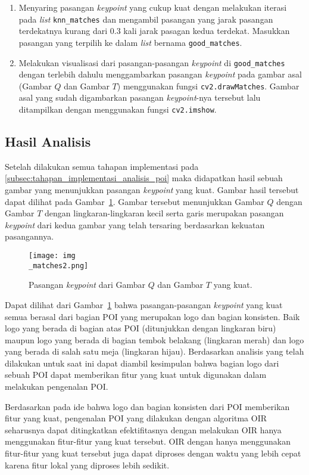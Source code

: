 \begin{enumerate}
	\item Menyaring pasangan \textit{keypoint} yang cukup kuat dengan melakukan iterasi pada \textit{list} \texttt{knn\_matches} dan mengambil pasangan yang jarak pasangan terdekatnya kurang dari $0.3$ kali jarak pasagan kedua terdekat. Masukkan pasangan yang terpilih ke dalam \textit{list} bernama \texttt{good\_matches}.
	\item Melakukan visualisasi dari pasangan-pasangan \textit{keypoint} di \texttt{good\_matches} dengan terlebih dahulu menggambarkan pasangan \textit{keypoint} pada gambar asal (Gambar $Q$ dan Gambar $T$) menggunakan fungsi \texttt{cv2.drawMatches}. Gambar asal yang sudah digambarkan pasangan \textit{keypoint}-nya tersebut lalu ditampilkan dengan menggunakan fungsi \texttt{cv2.imshow}.
\end{enumerate}

\subsection{Hasil Analisis}
Setelah dilakukan semua tahapan implementasi pada \ref{subsec:tahapan_implementasi_analisis_poi} maka didapatkan hasil sebuah gambar yang menunjukkan pasangan \textit{keypoint} yang kuat. Gambar hasil tersebut dapat dilihat pada Gambar~\ref{fig:keypoint_matches}. Gambar tersebut menunjukkan Gambar $Q$ dengan Gambar $T$ dengan lingkaran-lingkaran kecil serta garis merupakan pasangan \textit{keypoint} dari kedua gambar yang telah tersaring berdasarkan kekuatan pasangannya.
\begin{figure}[H]
	\centering
	\texttt{[image: img\\\_matches2.png]}
	\caption{Pasangan \textit{keypoint} dari Gambar $Q$ dan Gambar $T$ yang kuat.}
	\label{fig:keypoint_matches}
\end{figure}

Dapat dilihat dari Gambar~\ref{fig:keypoint_matches} bahwa pasangan-pasangan \textit{keypoint} yang kuat semua berasal dari bagian POI yang merupakan logo dan bagian konsisten. Baik logo yang berada di bagian atas POI (ditunjukkan dengan lingkaran biru) maupun logo yang berada di bagian tembok belakang (lingkaran merah) dan logo yang berada di salah satu meja (lingkaran hijau). Berdasarkan analisis yang telah dilakukan untuk saat ini dapat diambil kesimpulan bahwa bagian logo dari sebuah POI dapat memberikan fitur yang kuat untuk digunakan dalam melakukan pengenalan POI. 

Berdasarkan pada ide bahwa logo dan bagian konsisten dari POI memberikan fitur yang kuat, pengenalan POI yang dilakukan dengan algoritma OIR seharusnya dapat ditingkatkan efektifitasnya dengan melakukan OIR hanya menggunakan fitur-fitur yang kuat tersebut. OIR dengan hanya menggunakan fitur-fitur yang kuat tersebut juga dapat diproses dengan waktu yang lebih cepat karena fitur lokal yang diproses lebih sedikit. 

